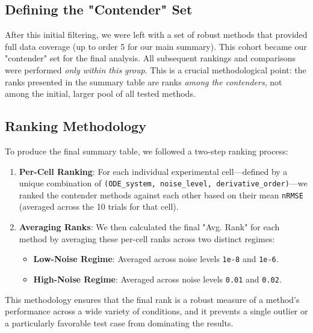 \subsection{Defining the "Contender" Set}
After this initial filtering, we were left with a set of robust methods that provided full data coverage (up to order 5 for our main summary). This cohort became our "contender" set for the final analysis. All subsequent rankings and comparisons were performed \textit{only within this group}. This is a crucial methodological point: the ranks presented in the summary table are ranks \textit{among the contenders}, not among the initial, larger pool of all tested methods.

\subsection{Ranking Methodology}
To produce the final summary table, we followed a two-step ranking process:
\begin{enumerate}
    \item \textbf{Per-Cell Ranking}: For each individual experimental cell—defined by a unique combination of \texttt{(ODE\_system, noise\_level, derivative\_order)}—we ranked the contender methods against each other based on their mean \texttt{nRMSE} (averaged across the 10 trials for that cell).
    \item \textbf{Averaging Ranks}: We then calculated the final "Avg. Rank" for each method by averaging these per-cell ranks across two distinct regimes:
    \begin{itemize}
        \item \textbf{Low-Noise Regime}: Averaged across noise levels \texttt{1e-8} and \texttt{1e-6}.
        \item \textbf{High-Noise Regime}: Averaged across noise levels \texttt{0.01} and \texttt{0.02}.
    \end{itemize}
\end{enumerate}
This methodology ensures that the final rank is a robust measure of a method's performance across a wide variety of conditions, and it prevents a single outlier or a particularly favorable test case from dominating the results.

